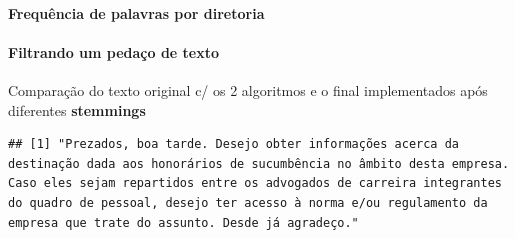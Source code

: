 \documentclass[]{article}
\newenvironment{Shaded}{\begin{snugshade}}{\end{snugshade}}
\newcommand{\KeywordTok}[1]{\textcolor[rgb]{0.13,0.29,0.53}{\textbf{#1}}}
\newcommand{\DataTypeTok}[1]{\textcolor[rgb]{0.13,0.29,0.53}{#1}}
\newcommand{\DecValTok}[1]{\textcolor[rgb]{0.00,0.00,0.81}{#1}}
\newcommand{\StringTok}[1]{\textcolor[rgb]{0.31,0.60,0.02}{#1}}
\newcommand{\OtherTok}[1]{\textcolor[rgb]{0.56,0.35,0.01}{#1}}
\newcommand{\OperatorTok}[1]{\textcolor[rgb]{0.81,0.36,0.00}{\textbf{#1}}}
\newcommand{\NormalTok}[1]{#1}
\let\oldparagraph\paragraph
\renewcommand{\paragraph}[1]{\oldparagraph{#1}\mbox{}}
\begin{document}
\paragraph{Frequência de palavras por
diretoria}\label{frequencia-de-palavras-por-diretoria}

\begin{Shaded}
\end{Shaded}

\paragraph{Filtrando um pedaço de
texto}\label{filtrando-um-pedaco-de-texto-1}

\begin{Shaded}
\end{Shaded}

Comparação do texto original c/ os 2 algoritmos e o final implementados
após diferentes \textbf{stemmings}

\begin{Shaded}
\end{Shaded}

\begin{verbatim}
## [1] "Prezados, boa tarde. Desejo obter informações acerca da destinação dada aos honorários de sucumbência no âmbito desta empresa. Caso eles sejam repartidos entre os advogados de carreira integrantes do quadro de pessoal, desejo ter acesso à norma e/ou regulamento da empresa que trate do assunto. Desde já agradeço."
\end{verbatim}
\end{document}
